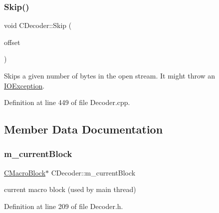\subsubsection{\texorpdfstring{Skip()}{Skip()}}
{\footnotesize\ttfamily void C\+Decoder\+::\+Skip (\begin{DoxyParamCaption}\item[{U\+I\+N\+T64}]{offset }\end{DoxyParamCaption})}

Skips a given number of bytes in the open stream. It might throw an \mbox{\hyperlink{structIOException}{I\+O\+Exception}}. 

Definition at line 449 of file Decoder.\+cpp.


\begin{DoxyCode}{0}

\end{DoxyCode}


\subsection{Member Data Documentation}
\mbox{\label{classCDecoder_aa21a930e7af6496ee5e6662659d62ecb}} 
\subsubsection{\texorpdfstring{m\_currentBlock}{m\_currentBlock}}
{\footnotesize\ttfamily \mbox{\hyperlink{classCDecoder_1_1CMacroBlock}{C\+Macro\+Block}}$\ast$ C\+Decoder\+::m\+\_\+current\+Block\hspace{0.3cm}{\ttfamily [private]}}



current macro block (used by main thread) 



Definition at line 209 of file Decoder.\+h.

\mbox{\label{classCDecoder_a2e3c3a814d7bc3766e35302367f8d9ae}} 
